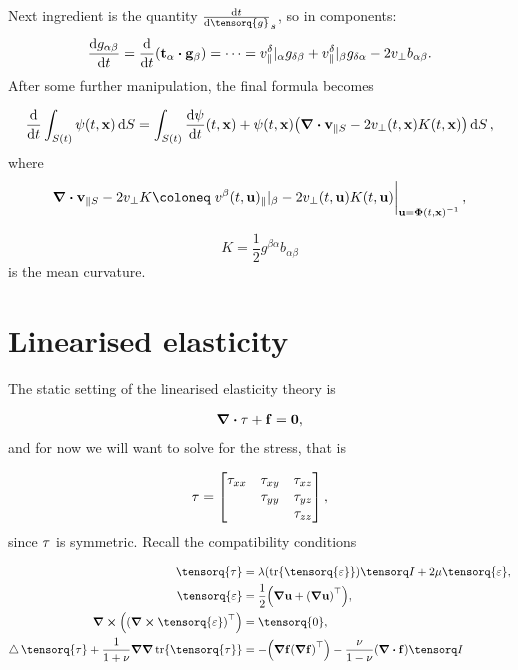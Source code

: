 \documentclass[reqno, a4paper]{article}
\begin{document}
Next ingredient is the quantity $\dv{t} \tensorq{g}_s$, so in components:
\[
	\dv{g_{\alpha \beta}}{t} = \dv{t}\qty(\vb{t}_{\alpha} \vdot \vb{g}_{\beta}) = \dots = v_{\parallel}^\delta|_{\alpha}g_{\delta \beta}+ v^{\delta}_{\parallel}|_{\beta}g_{\delta \alpha}-2v_{\perp}b_{\alpha \beta}.
\]
After some further manipulation, the final formula becomes

\begin{equation}
	\dv{t} \int_{S(t)}\psi(t,\vb{x})\dd{S} = \int_{S(t)}\dv{\psi}{t}\qty(t,\vb{x})+\psi(t,\vb{x})\qty(\divergence{\vb{v}_{\parallel S}} - 2 v_{\perp}\qty(t,\vb{x})K\qty(t,\vb{x}))\dd{S},
\end{equation}
where
\[
	\divergence{\vb{v}_{\parallel S}} - 2 v_{\perp}K \coloneq \eval{v^{\beta}(t,\vb{u})_{\parallel}|_{\beta}-2v_{\perp}(t,\vb{u})K(t,\vb{u})}_{\vb{u}=\inverse{\vb*{\Phi}\qty(t,\vb{x})}},
	\]

	\[
		K = \frac{1}{2}g^{\beta \alpha} b_{\alpha \beta}
	\]
	is the mean curvature.

\section{Linearised elasticity}
\label{sec:linearised_elasticity}

The static setting of the linearised elasticity theory is

\begin{align}
\label{eq:static_momentum_balance}
\divergence{\tensorq{\tau}} + \vb{f} = \vb{0},
\end{align}
and for now we will want to solve for the stress, that is

\[
	\mathbb{\tau} = \begin{bmatrix}
		\tau_{xx} & \tau_{xy} & \tau_{xz} \\
			  & \tau_{yy} & \tau_{yz} \\
			  & & \tau_{zz}
	\end{bmatrix},
\]
since $\mathbb{\tau}$ is symmetric. Recall the compatibility conditions

\begin{align}
  \label{eq:compatibility}
  \tensorq{\tau} &= \lambda \qty(\tr \tensorq{\varepsilon})\identity + 2 \mu \tensorq{\varepsilon}, \\
  \tensorq{\varepsilon} &= \frac{1}{2}\qty(\grad \vb{u}+ \transpose{\qty(\grad \vb{u})}),\\
  \curl{\qty(\transpose{\qty(\curl{\tensorq{ \varepsilon}})})} &= \tensorq{0}, \\
  \laplace \tensorq{\tau}+\frac{1}{1+\nu} \grad \grad \tr \tensorq{\tau} &= -\qty(\grad \vb{f} \transpose{\qty(\grad \vb{f})}) - \frac{\nu}{1-\nu} \qty(\divergence{\vb{f}})\identity
\end{align}
\end{document}
